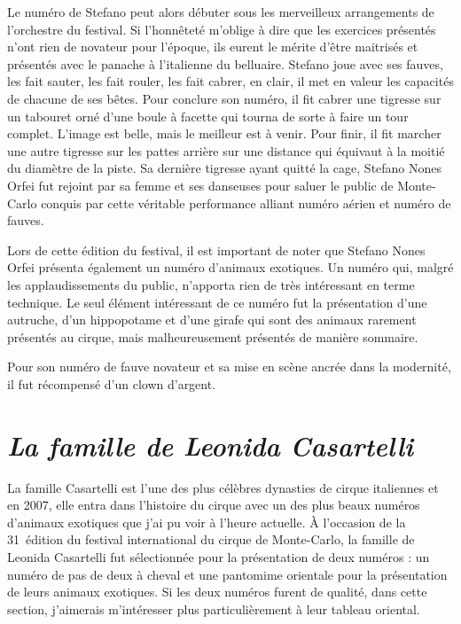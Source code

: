 Le numéro de Stefano peut alors débuter sous les merveilleux arrangements de l’orchestre du festival. Si l’honnêteté m’oblige à dire que les exercices présentés n’ont rien de novateur pour l’époque, ils eurent le mérite d’être maitrisés et présentés avec le panache à l’italienne du belluaire. Stefano joue avec ses fauves, les fait sauter, les fait rouler, les fait cabrer, en clair, il met en valeur les capacités de chacune de ses bêtes. Pour conclure son numéro, il fit cabrer une tigresse sur un tabouret orné d'une boule à facette qui tourna de sorte à faire un tour complet. L’image est belle, mais le meilleur est à venir. Pour finir, il fit marcher une autre tigresse sur les pattes arrière sur une distance qui équivaut à la moitié du diamètre de la piste. Sa dernière tigresse ayant quitté la cage, Stefano Nones Orfei fut rejoint par sa femme et ses danseuses pour saluer le public de Monte-Carlo conquis par cette véritable performance alliant numéro aérien et numéro de fauves.

Lors de cette édition du festival, il est important de noter que Stefano Nones Orfei présenta également un numéro d’animaux exotiques. Un numéro qui, malgré les applaudissements du public, n’apporta rien de très intéressant en terme technique. Le seul élément intéressant de ce numéro fut la présentation d’une autruche, d’un hippopotame et d’une girafe qui sont des animaux rarement présentés au cirque, mais malheureusement présentés de manière sommaire.

Pour son numéro de fauve novateur et sa mise en scène ancrée dans la modernité, il fut récompensé d’un clown d’argent.

\section*{\textit{La famille de Leonida Casartelli}}
{}

La famille Casartelli est l'une des plus célèbres dynasties de cirque italiennes et en 2007, elle entra dans l'histoire du cirque avec un des plus beaux numéros d'animaux exotiques que j'ai pu voir à l'heure actuelle. À l’occasion de la 31\ieme~édition du festival international du cirque de Monte-Carlo, la famille de Leonida Casartelli fut sélectionnée pour la présentation de deux numéros : un numéro de pas de deux à cheval et une pantomime orientale pour la présentation de leurs animaux exotiques. Si les deux numéros furent de qualité, dans cette section, j'aimerais m’intéresser plus particulièrement à leur tableau oriental.

